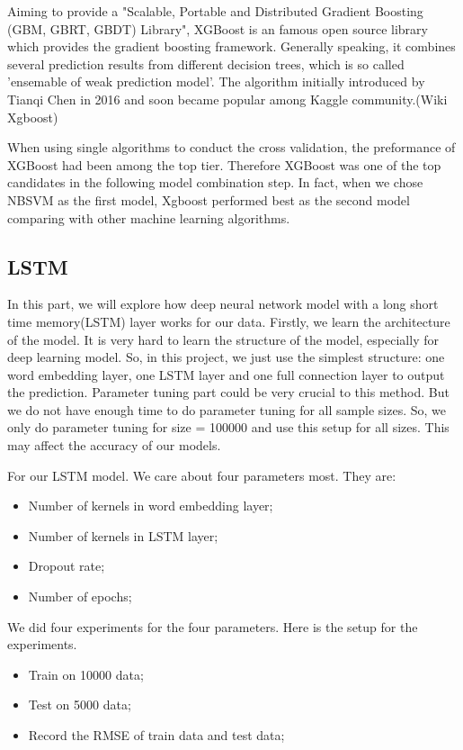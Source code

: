 \documentclass[letterpaper]{article} %
\begin{document}
Aiming to provide a "Scalable, Portable and Distributed Gradient Boosting (GBM, GBRT, GBDT) Library", XGBoost is an famous open source library which provides the gradient boosting framework. Generally speaking, it combines several prediction results from different decision trees, which is so called 'ensemable of weak prediction model'. The algorithm initially introduced by Tianqi Chen in 2016 and soon became popular among Kaggle community.(Wiki Xgboost)\par
When using single algorithms to conduct the cross validation, the preformance of XGBoost had been among the top tier. Therefore XGBoost was one of the top candidates in the following model combination step. In fact, when we chose NBSVM as the first model, Xgboost performed best as the second model comparing with other machine learning algorithms.

\subsection{LSTM}

In this part, we will explore how deep neural network model with a long short time memory(LSTM) layer works for our data. 
Firstly, we learn the architecture of the model. It is very hard to learn the structure of the model, especially for deep learning model. So, in this project, we just use the simplest structure: one word embedding layer, one LSTM layer and one full connection layer to output the prediction. 
Parameter tuning part could be very crucial to this method. But we do not have enough time to do parameter tuning for all sample sizes. So, we only do parameter tuning for size = 100000 and use this setup for all sizes. This may affect the accuracy of our models. \par

For our LSTM model. We care about four parameters most. They are:
\begin{itemize}
\item Number of kernels in word embedding layer;
\item Number of kernels in LSTM layer;
\item Dropout rate;
\item Number of epochs;
\end{itemize}
We did four experiments for the four parameters. Here is the setup for the experiments.
\begin{itemize}
\item Train on 10000 data;
\item Test on 5000 data;
\item Record the RMSE of train data and test data;
\end{itemize}
\end{document}
